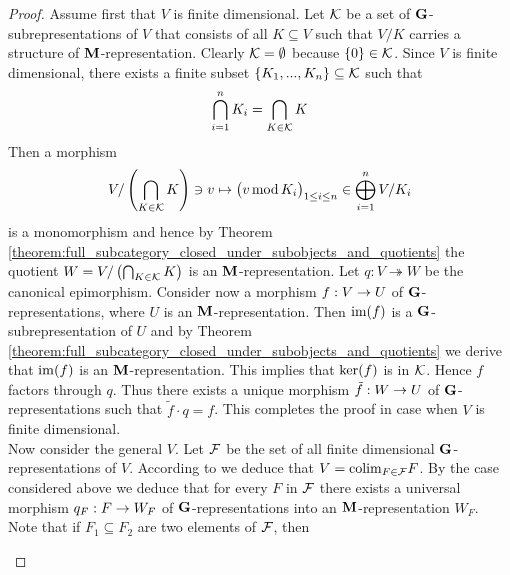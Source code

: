 \begin{proof}
Assume first that $V$ is finite dimensional. Let ${\mathcal K}$ be a set of $\mathbf{G}$-subrepresentations of $V$ that consists of all $K \subseteq V$ such that $V/K$ carries a structure of $\mathbf{M}$-representation. Clearly ${\mathcal K} = \emptyset$ because $\{0\}\in {\mathcal K}$. Since $V$ is finite dimensional, there exists a finite subset $\{K_1,...,K_n\}\subseteq {\mathcal K}$ such that
$$\bigcap_{i=1}^nK_i = \bigcap_{K\in {\mathcal K}}K$$
Then a morphism
$$V/\left( \bigcap_{K \in {\mathcal K}}K \right)\ni v \mapsto \big(v\,\mathrm{mod}\,K_i\big)_{1\leq i\leq n} \in \bigoplus_{i=1}^nV/K_i$$
is a monomorphism and hence by Theorem \ref{theorem:full_subcategory_closed_under_subobjects_and_quotients} the quotient $W = V/\left( \bigcap_{K \in {\mathcal K}}K \right)$ is an $\mathbf{M}$-representation. Let $q:V \twoheadrightarrow W$ be the canonical epimorphism. Consider now a morphism $f:V\rightarrow U$ of $\mathbf{G}$-representations, where $U$ is an $\mathbf{M}$-representation. Then $\mathrm{im}(f)$ is a $\mathbf{G}$-subrepresentation of $U$ and by Theorem \ref{theorem:full_subcategory_closed_under_subobjects_and_quotients} we derive that $\mathrm{im}(f)$ is an $\mathbf{M}$-representation. This implies that $\mathrm{ker}(f)$ is in ${\mathcal K}$. Hence $f$ factors through $q$. Thus there exists a unique morphism $\tilde{f}:W\rightarrow U$ of $\mathbf{G}$-representations such that $\tilde{f}\cdot q = f$. This completes the proof in case when $V$ is finite dimensional.\\
Now consider the general $V$. Let ${\mathcal F}$ be the set of all finite dimensional $\mathbf{G}$-representations of $V$. According to {\cite[Corollary 15.2]{Monoid_k_functors}} we deduce that $V = \mathrm{colim}_{F\in {\mathcal F}}F$. By the case considered above we deduce that for every $F$ in ${\mathcal F}$ there exists a universal morphism $q_F:F\rightarrow W_F$ of $\mathbf{G}$-representations into an $\mathbf{M}$-representation $W_F$. Note that if $F_1\subseteq F_2$ are two elements of ${\mathcal F}$, then
\begin{center}
\end{center}
\end{proof}
